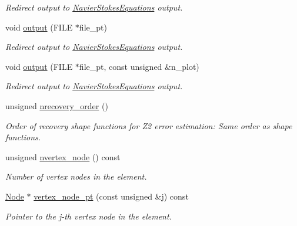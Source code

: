 \begin{DoxyCompactItemize}
\begin{DoxyCompactList}\small\item\em Redirect output to \hyperlink{classoomph_1_1NavierStokesEquations}{Navier\+Stokes\+Equations} output. \end{DoxyCompactList}\item 
void \hyperlink{classoomph_1_1GeneralisedNewtonianAxisymmetricTTaylorHoodElement_aedc97079cc4048b5467c5010f53ebc07}{output} (F\+I\+LE $\ast$file\+\_\+pt)
\begin{DoxyCompactList}\small\item\em Redirect output to \hyperlink{classoomph_1_1NavierStokesEquations}{Navier\+Stokes\+Equations} output. \end{DoxyCompactList}\item 
void \hyperlink{classoomph_1_1GeneralisedNewtonianAxisymmetricTTaylorHoodElement_a52f26763af5a245e6bd5b578abf16095}{output} (F\+I\+LE $\ast$file\+\_\+pt, const unsigned \&n\+\_\+plot)
\begin{DoxyCompactList}\small\item\em Redirect output to \hyperlink{classoomph_1_1NavierStokesEquations}{Navier\+Stokes\+Equations} output. \end{DoxyCompactList}\item 
unsigned \hyperlink{classoomph_1_1GeneralisedNewtonianAxisymmetricTTaylorHoodElement_adcb0106a988171745cb375a4ba11658e}{nrecovery\+\_\+order} ()
\begin{DoxyCompactList}\small\item\em Order of recovery shape functions for Z2 error estimation\+: Same order as shape functions. \end{DoxyCompactList}\item 
unsigned \hyperlink{classoomph_1_1GeneralisedNewtonianAxisymmetricTTaylorHoodElement_a0630c3c5533051b6f0e348571bd0c3ce}{nvertex\+\_\+node} () const
\begin{DoxyCompactList}\small\item\em Number of vertex nodes in the element. \end{DoxyCompactList}\item 
\hyperlink{classoomph_1_1Node}{Node} $\ast$ \hyperlink{classoomph_1_1GeneralisedNewtonianAxisymmetricTTaylorHoodElement_a161e0372d0a130c4c4ca2edc9abaa355}{vertex\+\_\+node\+\_\+pt} (const unsigned \&j) const
\begin{DoxyCompactList}\small\item\em Pointer to the j-\/th vertex node in the element. \end{DoxyCompactList}\item 

\end{DoxyCompactItemize}
